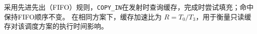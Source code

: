采用先进先出（FIFO）规则，\texttt{COPY\_IN}在发射时查询缓存，完成时尝试填充；命中保持FIFO顺序不变。\cite{problemA}
在相同方案下，缓存加速比为 $R=T_0/T_3$，用于衡量只读缓存对该调度方案的执行时间影响。
